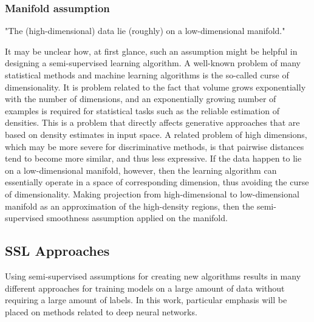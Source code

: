 \documentclass[12pt]{article}
\theoremstyle{definition}
\DeclareRobustCommand{\[}{\begin{equation}}
\DeclareRobustCommand{\]}{\end{equation}}
\begin{document}
    \subsubsection{Manifold assumption}
        "The (high-dimensional) data lie (roughly) on a low-dimensional
        manifold." \par
        It may be unclear how, at first glance, such an assumption might be helpful in designing a semi-supervised learning algorithm. A well-known problem of many statistical methods and
        machine learning algorithms is the so-called curse of dimensionality. It is
        problem related to the fact that volume grows exponentially with the number of dimensions,
        and an exponentially growing number of examples is required for statistical tasks
        such as the reliable estimation of densities. This is a problem that directly affects
        generative approaches that are based on density estimates in input space. A related
        problem of high dimensions, which may be more severe for discriminative methods,
        is that pairwise distances tend to become more similar, and thus less expressive.
        If the data happen to lie on a low-dimensional manifold, however, then the
        learning algorithm can essentially operate in a space of corresponding dimension,
        thus avoiding the curse of dimensionality.
        Making projection from high-dimensional to low-dimensional manifold as an approximation of the high-density regions, then the semi-supervised smoothness assumption applied on the manifold. \cite{Semi-Supervised-Book}

\subsection{SSL Approaches}
    Using semi-supervised assumptions for creating new algorithms results in many different approaches for training models on a large amount of data without requiring a large amount of labels. In this work, particular emphasis will be placed on methods related to deep neural networks.
    
\end{document}
